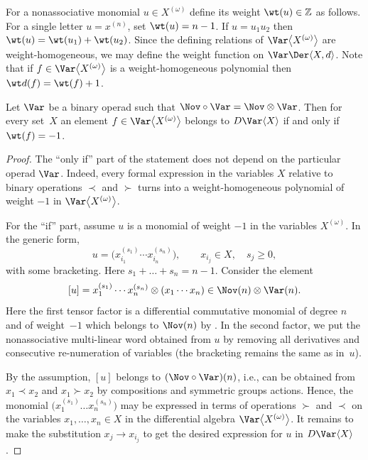 For a nonassociative monomial $u\in X^{(\omega )}$ define its
weight $\wt(u)\in \mathbb Z$ as follows. For a single letter
$u=x^{(n)}$, set $\wt(u)=n-1$. If $u=u_1u_2$ then
$\wt(u) = \wt(u_1)+\wt(u_2)$.
Since the defining relations of $\Var\bigl\langle X^{(\omega )}\bigr\rangle $
are weight-homogeneous, we may define the weight function
on $\Var\Der\langle X,d\rangle $.
Note that if $f\in \Var\bigl\langle X^{(\omega )}\bigr\rangle $
is a weight-homogeneous polynomial then
$\wt d(f) = \wt(f)+1$.

\begin{Lemma}\label{lem:Weight-criterion}
 Let $\Var $ be a binary operad such that
 $\Nov\circ \Var = \Nov \otimes \Var $.
Then for every set~$X$ an element $f\in \Var\bigl\langle X^{(\omega )}\bigr\rangle $
belongs to $D\Var \langle X\rangle $ if and only if
$\wt (f)=-1$.
\end{Lemma}

\begin{proof}
The ``only if'' part of the statement does not depend on the particular operad $\Var $.
Indeed,
every formal expression in the variables $X$ relative to binary operations $\prec$
and $\succ $ turns into a weight-homogeneous polynomial of weight $-1$ in $\Var\bigl\langle X^{(\omega )}\bigr\rangle $.

For the ``if'' part, assume $u$ is a monomial of weight $-1$ in the variables $X^{(\omega )}$.
In the generic form,
\[
 u = \bigl(x_{i_1}^{(s_1)}\cdots x_{i_n}^{(s_n)}\bigr), \qquad x_{i_j}\in X,\quad s_j\ge 0,
\]
with some bracketing. Here $s_1+\dots +s_n = n-1$.
Consider the element
\[
[u] = x_{1}^{(s_1)}\cdots x_{n}^{(s_n)} \otimes (x_1\cdots x_n) \in \Nov(n)\otimes \Var(n).
\]
Here the first tensor factor is a differential commutative monomial of degree $n$ and of weight~$-1$
which belongs to $\Nov(n)$ by \cite{DzhLofwall2002}. In the second factor, we put the
nonassociative multi-linear word
obtained from $u$ by removing all derivatives and consecutive
re-numeration of variables (the bracketing remains the same as in~$u$).

By the assumption, $[u]$ belongs to $(\Nov\circ \Var)(n)$, i.e., can be obtained
from $x_1\prec x_2$ and $x_1\succ x_2$ by compositions and symmetric groups actions.
Hence,
the monomial $\bigl(x_{1}^{(s_1)}\dots x_{n}^{(s_n)}\bigr)$ may be expressed in terms of
operations $\succ $ and $\prec$ on the variables $x_1,\dots,x_n\in X$
in the differential algebra $\Var\bigl\langle X^{(\omega )}\bigr\rangle $.
It remains to make the substitution
$x_{j}\to x_{i_j}$ to get the desired expression for $u$ in $D\Var \langle X\rangle $.
\end{proof}
